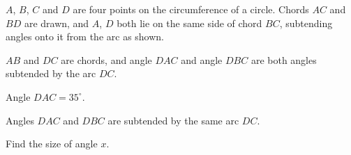 \documentclass[11pt]{article}
\begin{document}
\begin{question}
\noindent $A$, $B$, $C$ and $D$ are four points on the circumference of a circle. Chords $AC$ and $BD$ are drawn, and $A$, $D$ both lie on the same side of chord $BC$, subtending angles onto it from the arc as shown.

$AB$ and $DC$ are chords, and angle $DAC$ and angle $DBC$ are both angles subtended by the arc $DC$.

\begin{center}
\end{center}

\noindent Angle $DAC = 35^\circ$.

Angles $DAC$ and $DBC$ are subtended by the same arc $DC$.

Find the size of angle $x$.
\vspace{4cm}
\begin{flushright}
\end{flushright}
\end{question}
\end{document}
